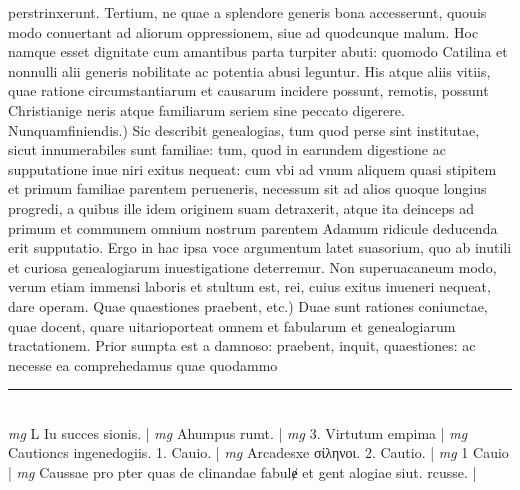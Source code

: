 \documentclass{article}
\begin{document}
\begin{pages}
perstrinxerunt. Tertium, ne quae a splendore generis bona accesserunt, quouis modo conuertant ad aliorum oppressionem, siue ad quodcunque  malum. Hoc namque  esset dignitate cum amantibus parta turpiter abuti: quomodo Catilina et nonnulli alii generis nobilitate ac potentia abusi leguntur. His atque  aliis vitiis, quae ratione circumstantiarum et causarum incidere possunt, remotis, possunt Christianige neris atque  familiarum seriem sine peccato digerere.  \pend\pstart Nunquamfiniendis.) Sic describit genealogias, tum quod perse sint institutae, sicut innumerabiles sunt familiae: tum, quod in earundem digestione ac supputatione inue niri exitus nequeat: cum vbi ad vnum aliquem quasi stipitem et primum familiae parentem perueneris, necessum sit ad alios quoque  longius progredi, a quibus ille idem originem suam detraxerit, atque  ita deinceps ad primum et communem omnium nostrum parentem Adamum ridicule deducenda erit supputatio. Ergo in hac ipsa voce argumentum latet suasorium, quo ab inutili et curiosa genealogiarum inuestigatione deterremur. Non superuacaneum modo, verum etiam immensi laboris et stultum est, rei, cuius exitus inueneri nequeat, dare operam.  \pend\pstart Quae quaestiones praebent, etc.) Duae sunt rationes coniunctae, quae docent, quare uitarioporteat omnem et fabularum et genealogiarum tractationem. Prior sumpta est a damnoso: praebent, inquit, quaestiones: ac necesse ea comprehedamus quae quodammo\pend
\vspace{0.5cm}\noindent
\vspace{0.2cm}\rule{1cm}{0.2pt}\\ 
\hspace{0.2cm}\textit{mg}
\footnotesize L Iu succes sionis. 
\normalsize| 
\hspace{0.2cm}\textit{mg}
\footnotesize Ahumpus rumt. 
\normalsize| 
\hspace{0.2cm}\textit{mg}
\footnotesize 3. Virtutum empima 
\normalsize| 
\hspace{0.2cm}\textit{mg}
\footnotesize Cautioncs ingenedogiis. 1. Cauio. 
\normalsize| 
\hspace{0.2cm}\textit{mg}
\footnotesize Arcadesxe σίληνοι. 2. Cautio. 
\normalsize| 
\hspace{0.2cm}\textit{mg}
\footnotesize 1 Cauio 
\normalsize| 
\hspace{0.2cm}\textit{mg}
\footnotesize Caussae pro pter quas de clinandae fabulɇ et gent alogiae siut. rcusse. 
\normalsize| 

\end{pages}
\end{document}
